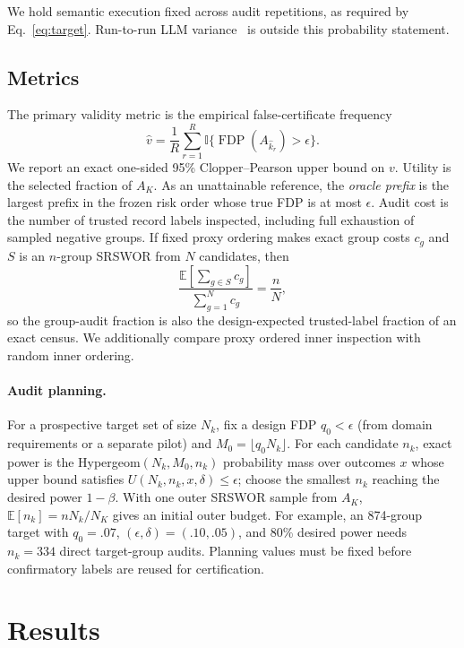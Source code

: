 \documentclass[runningheads]{llncs}
\newcommand{\FDP}{\operatorname{FDP}}
\newcommand{\ind}{\mathbb{I}}
\newcommand{\E}{\mathbb{E}}
\begin{document}
We hold semantic execution fixed across audit repetitions, as required by Eq.~\eqref{eq:target}. Run-to-run LLM variance~\cite{variance2026} is outside this probability statement.

\subsection{Metrics}
The primary validity metric is the empirical false-certificate frequency
\begin{equation}
\widehat v=\frac{1}{R}\sum_{r=1}^{R}\ind\{\FDP(A_{\widehat{k}_r})>\epsilon\}.
\end{equation}
We report an exact one-sided 95\% Clopper--Pearson upper bound on $v$. Utility is the selected fraction of $A_K$. As an unattainable reference, the \emph{oracle prefix} is the largest prefix in the frozen risk order whose true FDP is at most $\epsilon$. Audit cost is the number of trusted record labels inspected, including full exhaustion of sampled negative groups. If fixed proxy ordering makes exact group costs $c_g$ and $S$ is an $n$-group SRSWOR from $N$ candidates, then
\begin{equation}
\frac{\E[\sum_{g\in S}c_g]}{\sum_{g=1}^{N}c_g}=\frac{n}{N},
\label{eq:census-cost}
\end{equation}
so the group-audit fraction is also the design-expected trusted-label fraction of an exact census. We additionally compare proxy ordered inner inspection with random inner ordering.

\paragraph{Audit planning.} For a prospective target set of size $N_k$, fix a design FDP $q_0<\epsilon$ (from domain requirements or a separate pilot) and $M_0=\lfloor q_0N_k\rfloor$. For each candidate $n_k$, exact power is the Hypergeom$(N_k,M_0,n_k)$ probability mass over outcomes $x$ whose upper bound satisfies $U(N_k,n_k,x,\delta)\le\epsilon$; choose the smallest $n_k$ reaching the desired power $1-\beta$. With one outer SRSWOR sample from $A_K$, $\E[n_k]=nN_k/N_K$ gives an initial outer budget. For example, an 874-group target with $q_0=.07$, $(\epsilon,\delta)=(.10,.05)$, and 80\% desired power needs $n_k=334$ direct target-group audits. Planning values must be fixed before confirmatory labels are reused for certification.

\section{Results}
\end{document}
